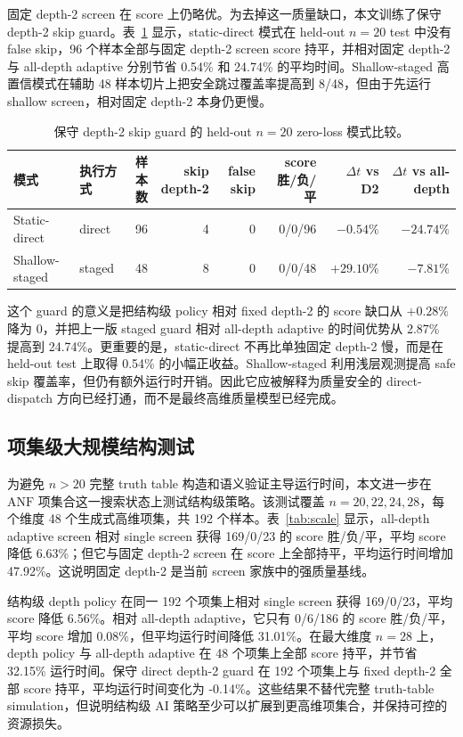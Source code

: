 \documentclass[UTF8,fontset=macnew,11pt]{ctexart}
\newcommand{\anf}{\ensuremath{\mathrm{ANF}}}
\begin{document}
固定 depth-2 screen 在 score 上仍略优。为去掉这一质量缺口，本文训练了保守 depth-2 skip guard。表~\ref{tab:guard} 显示，static-direct 模式在 held-out $n=20$ test 中没有 false skip，96 个样本全部与固定 depth-2 screen score 持平，并相对固定 depth-2 与 all-depth adaptive 分别节省 0.54\% 和 24.74\% 的平均时间。Shallow-staged 高置信模式在辅助 48 样本切片上把安全跳过覆盖率提高到 8/48，但由于先运行 shallow screen，相对固定 depth-2 本身仍更慢。

\begin{table}[t]
\centering
\scriptsize
\caption{保守 depth-2 skip guard 的 held-out $n=20$ zero-loss 模式比较。}
\label{tab:guard}
\begin{tabular}{llrrrrrr}
\toprule
模式 & 执行方式 & 样本数 & skip depth-2 & false skip & score 胜/负/平 & $\Delta t$ vs D2 & $\Delta t$ vs all-depth \\
\midrule
Static-direct & direct & 96 & 4 & 0 & 0/0/96 & $-0.54\%$ & $-24.74\%$ \\
Shallow-staged & staged & 48 & 8 & 0 & 0/0/48 & $+29.10\%$ & $-7.81\%$ \\
\bottomrule
\end{tabular}
\end{table}

这个 guard 的意义是把结构级 policy 相对 fixed depth-2 的 score 缺口从 $+0.28\%$ 降为 $0$，并把上一版 staged guard 相对 all-depth adaptive 的时间优势从 2.87\% 提高到 24.74\%。更重要的是，static-direct 不再比单独固定 depth-2 慢，而是在 held-out test 上取得 0.54\% 的小幅正收益。Shallow-staged 利用浅层观测提高 safe skip 覆盖率，但仍有额外运行时开销。因此它应被解释为质量安全的 direct-dispatch 方向已经打通，而不是最终高维质量模型已经完成。

\subsection{项集级大规模结构测试}

为避免 $n>20$ 完整 truth table 构造和语义验证主导运行时间，本文进一步在 \anf{} 项集合这一搜索状态上测试结构级策略。该测试覆盖 $n=20,22,24,28$，每个维度 48 个生成式高维项集，共 192 个样本。表~\ref{tab:scale} 显示，all-depth adaptive screen 相对 single screen 获得 169/0/23 的 score 胜/负/平，平均 score 降低 6.63\%；但它与固定 depth-2 screen 在 score 上全部持平，平均运行时间增加 47.92\%。这说明固定 depth-2 是当前 screen 家族中的强质量基线。

结构级 depth policy 在同一 192 个项集上相对 single screen 获得 169/0/23，平均 score 降低 6.56\%。相对 all-depth adaptive，它只有 0/6/186 的 score 胜/负/平，平均 score 增加 0.08\%，但平均运行时间降低 31.01\%。在最大维度 $n=28$ 上，depth policy 与 all-depth adaptive 在 48 个项集上全部 score 持平，并节省 32.15\% 运行时间。保守 direct depth-2 guard 在 192 个项集上与 fixed depth-2 全部 score 持平，平均运行时间变化为 -0.14\%。这些结果不替代完整 truth-table simulation，但说明结构级 AI 策略至少可以扩展到更高维项集合，并保持可控的资源损失。
\end{document}
